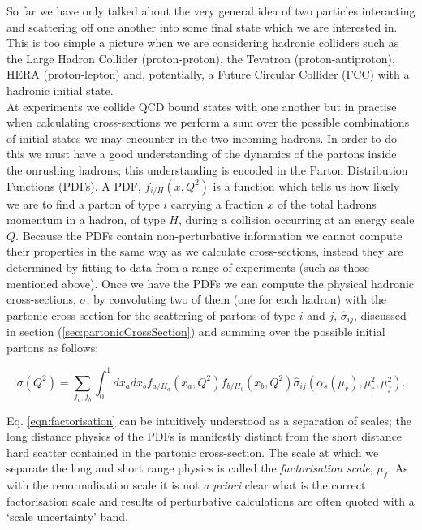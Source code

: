 	So far we have only talked about the very general idea of two particles interacting and scattering off one another into
	some final state which we are interested in.  This is too simple a picture when we are considering hadronic colliders
	such as the Large Hadron Collider (proton-proton), the Tevatron (proton-antiproton), HERA (proton-lepton) and, potentially,
	a Future Circular Collider (FCC) with a hadronic initial state.\\At experiments we collide QCD bound states with one another
	but in practise when calculating cross-sections we perform a sum over the possible combinations of initial states we may
	encounter in the two incoming hadrons.  In order to do this we must have a good understanding of the dynamics of the partons
	inside the onrushing hadrons; this understanding is encoded in the Parton Distribution Functions (PDFs).  A PDF,
	$f_{i/H}(x, Q^2)$ is a function which tells us how likely we are to find a parton of type $i$ carrying a fraction $x$ of the
	total hadrons momentum in a hadron, of type $H$, during a collision occurring at an energy scale $Q$.  Because the PDFs contain
	non-perturbative information we cannot compute their properties in the same way as we calculate cross-sections, instead they
	are determined by fitting to data from a range of experiments (such as those mentioned above).  Once we have the
	PDFs we can compute the physical hadronic cross-sections, $\sigma$, by convoluting two of them (one for each hadron) with
	the partonic cross-section for the scattering of partons of type $i$ and $j$, $\hat{\sigma}_{ij}$, discussed in section
	(\ref{sec:partonicCrossSection}) and summing over the possible initial partons as follows:

	\begin{equation}
		\sigma(Q^2) = \sum_{f_a,f_b}\int_0^1dx_adx_bf_{a/H_a}(x_a, Q^2)f_{b/H_b}(x_b, Q^2)\hat{\sigma}_{ij}(\alpha_s(\mu_r), \mu_r^2, \mu_f^2).
		\label{eqn:factorisation}
	\end{equation}

	Eq. \eqref{eqn:factorisation} can be intuitively understood as a separation of scales; the long distance physics of the PDFs is
	manifestly distinct from the short distance hard scatter contained in the partonic cross-section.  The scale at which we separate the
	long and short range physics is called the \emph{factorisation scale}, $\mu_f$.  As with the renormalisation scale it is not
	\emph{a priori} clear what is the correct factorisation scale and results of perturbative calculations are often quoted with
	a `scale uncertainty' band.


